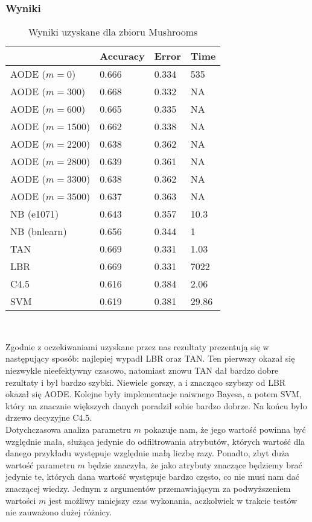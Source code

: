 \documentclass[16]{article}
\begin{document}
\subsubsection{Wyniki}
\begin{table}[ht]
\begin{center}
\begin{tabular}{ |l|l|l|l| }
\hline
&  Accuracy & Error & Time
\\ \hline
AODE ($m = 0$) & 0.666 & 0.334 & 535 
\\ \hline
AODE ($m = 300$) & 0.668 & 0.332 & NA
\\ \hline
AODE ($m = 600$) & 0.665 & 0.335 & NA
\\ \hline
AODE ($m = 1500$) & 0.662 & 0.338 & NA
\\ \hline
AODE ($m = 2200$) & 0.638 & 0.362 & NA
\\ \hline
AODE ($m = 2800$) & 0.639 & 0.361 & NA
\\ \hline
AODE ($m = 3300$) & 0.638 & 0.362 & NA
\\ \hline
AODE ($m = 3500$) & 0.637 & 0.363 & NA
\\ \hline
NB (e1071) & 0.643 & 0.357 & 10.3
\\ \hline
NB (bnlearn) & 0.656 & 0.344 & 1
\\ \hline
TAN & 0.669 & 0.331 & 1.03
\\ \hline
LBR & 0.669 & 0.331 & 7022
\\ \hline
C4.5 & 0.616 & 0.384 & 2.06
\\ \hline
SVM & 0.619 & 0.381 & 29.86
\\ \hline
\end{tabular} \\
\caption{Wyniki uzyskane dla zbioru Mushrooms}
\end{center}
\end{table}
Zgodnie z oczekiwaniami uzyskane przez nas rezultaty prezentują się w następujący sposób: najlepiej wypadł LBR oraz TAN. Ten pierwszy okazał się niezwykle nieefektywny czasowo, natomiast znowu TAN dał bardzo dobre rezultaty i był bardzo szybki. Niewiele gorszy, a i znacząco szybszy od LBR okazał się AODE. Kolejne były implementacje naiwnego Bayesa, a potem SVM, który na znacznie większych danych poradził sobie bardzo dobrze. Na końcu było drzewo decyzyjne C4.5. \\ Dotychczasowa analiza parametru $m$ pokazuje nam, że jego wartość powinna być względnie mała, służąca jedynie do odfiltrowania atrybutów, których wartość dla danego przykładu występuje względnie małą liczbę razy. Ponadto, zbyt duża wartość parametru $m$ będzie znaczyła, że jako atrybuty znaczące będziemy brać jedynie te, których dana wartość występuje bardzo często, co nie musi nam dać znaczącej wiedzy. Jednym z argumentów przemawiającym za podwyższeniem wartości $m$ jest możliwy mniejszy czas wykonania, aczkolwiek w trakcie testów nie zauważono dużej różnicy.
\end{document}
